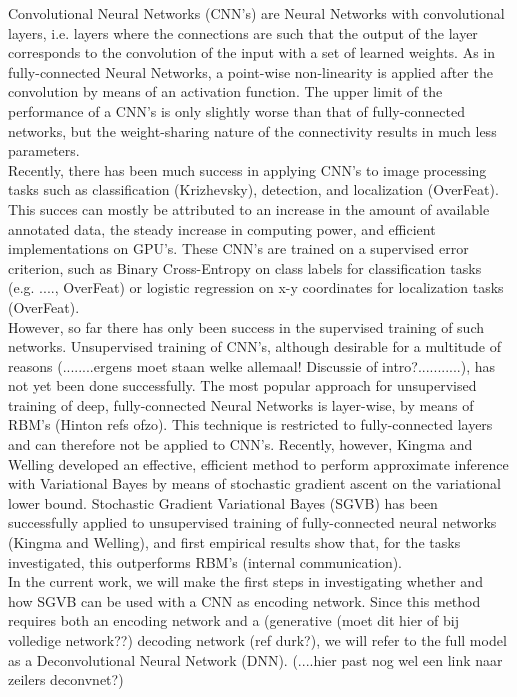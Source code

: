 Convolutional Neural Networks (CNN's) are Neural Networks with convolutional layers, i.e. layers where the connections are such that the output of the layer corresponds to the convolution of the input with a set of learned weights. As in fully-connected Neural Networks, a point-wise non-linearity is applied after the convolution by means of an activation function. The upper limit of the performance of a CNN's is only slightly worse than that of fully-connected networks, but the weight-sharing nature of the connectivity results in much less parameters. \\
Recently, there has been much success in applying CNN's to image processing tasks such as classification (Krizhevsky), detection, and localization (OverFeat). This succes can mostly be attributed to an increase in the amount of available annotated data, the steady increase in computing power, and efficient implementations on GPU's. These CNN's are trained on a supervised error criterion, such as Binary Cross-Entropy on class labels for classification tasks (e.g. ...., OverFeat) or logistic regression on x-y coordinates for localization tasks (OverFeat).\\
However, so far there has only been success in the supervised training of such networks. Unsupervised training of CNN's, although desirable for a multitude of reasons (........ergens moet staan welke allemaal! Discussie of intro?...........), has not yet been done successfully. The most popular approach for unsupervised training of deep, fully-connected Neural Networks is layer-wise, by means of RBM's (Hinton refs ofzo). This technique is restricted to fully-connected layers and can therefore not be applied to CNN's. Recently, however, Kingma and Welling developed an effective, efficient method to perform approximate inference with Variational Bayes by means of stochastic gradient ascent on the variational lower bound. Stochastic Gradient Variational Bayes (SGVB) has been successfully applied to unsupervised training of fully-connected neural networks (Kingma and Welling), and first empirical results show that, for the tasks investigated, this outperforms RBM's (internal communication). \\
In the current work, we will make the first steps in investigating whether and how SGVB can be used with a CNN as encoding network. Since this method requires both an encoding network and a (generative (moet dit hier of bij volledige network??) decoding network (ref durk?), we will refer to the full model as a Deconvolutional Neural Network (DNN). (....hier past nog wel een link naar zeilers deconvnet?)


